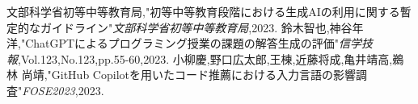 \documentclass[a4j,twocolumn,9pt]{jarticle}
\begin{document}



\begin{thebibliography}{9}
文部科学省初等中等教育局,"初等中等教育段階における生成AIの利用に関する暫定的なガイドライン"\textit{文部科学省初等中等教育局},2023.
鈴木智也,神谷年洋,"ChatGPTによるプログラミング授業の課題の解答生成の評価"\textit{信学技報},Vol.123,No.123,pp.55-60,2023.
小柳慶,野口広太郎,王棟,近藤将成,亀井靖高,鵜林 尚靖,"GitHub Copilotを用いたコード推薦における入力言語の影響調査"\textit{FOSE2023},2023.
\end{thebibliography}
\end{document}
